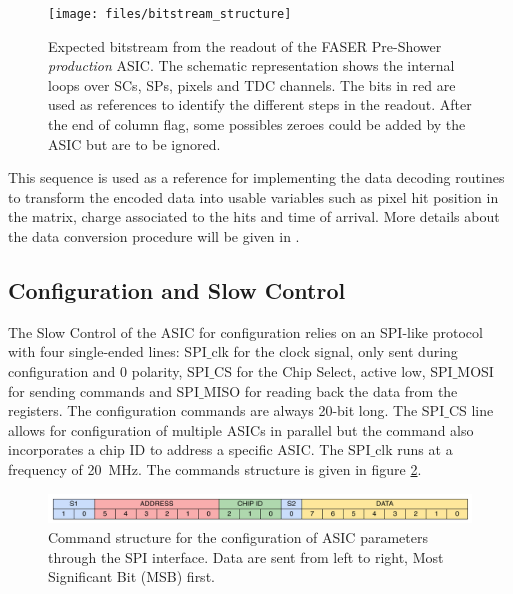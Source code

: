 			\begin{figure}[h]
				\centering
				\texttt{[image: files/bitstream\_structure]}
				\caption{Expected bitstream from the readout of the FASER Pre-Shower \textit{production} ASIC. The schematic representation shows the internal loops over SCs, SPs, pixels and TDC channels. The bits in red are used as references to identify the different steps in the readout. After the end of column flag, some possibles zeroes could be added by the ASIC but are to be ignored. }
				\label{im:bitstream_structure}
			\end{figure}
			
			This sequence is used as a reference for implementing the data decoding routines to transform the encoded data into usable variables such as pixel hit position in the matrix, charge associated to the hits and time of arrival. More details about the data conversion procedure will be given in . 
		\clearpage
		\subsection{Configuration and Slow Control}
		The Slow Control of the ASIC for configuration relies on an SPI-like protocol with four single-ended lines: SPI$\_$clk for the clock signal, only sent during configuration and 0 polarity, SPI$\_$CS for the Chip Select, active low, SPI$\_$MOSI for sending commands and SPI$\_$MISO for reading back the data from the registers. The configuration commands are always 20-bit long. The SPI$\_$CS line allows for configuration of multiple ASICs in parallel but the command also incorporates a chip ID to address a specific ASIC. The SPI$\_$clk runs at a frequency of \SI{20}{\mega\hertz}. The commands structure is given in figure \ref{im:command_structure}. 
		
		\begin{figure}[h]
			\centering
			\includegraphics[width=1.0\textwidth]{files/command_structure}
			\caption{Command structure for the configuration of ASIC parameters through the SPI interface. Data are sent from left to right, Most Significant Bit (MSB) first.}
			\label{im:command_structure}
		\end{figure}
		
